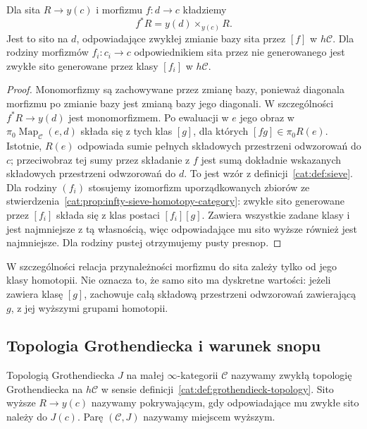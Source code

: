 \begin{stwierdzenie}\label{cat:prop:infty-sieve-pullback}
Dla sita $R\to y(c)$ i morfizmu $f:d\to c$ kładziemy
\[
 f^*R=y(d)\times_{y(c)}R.
\]
Jest to sito na $d$, odpowiadające zwykłej zmianie bazy sita przez $[f]$ w $h\mathcal C$. Dla rodziny morfizmów $f_i:c_i\to c$ odpowiednikiem sita przez nie generowanego jest zwykłe sito generowane przez klasy $[f_i]$ w $h\mathcal C$.
\end{stwierdzenie}
\begin{proof}
Monomorfizmy są zachowywane przez zmianę bazy, ponieważ diagonala morfizmu po zmianie bazy jest zmianą bazy jego diagonali. W szczególności $f^*R\to y(d)$ jest monomorfizmem. Po ewaluacji w $e$ jego obraz w $\pi_0\operatorname{Map}_{\mathcal C}(e,d)$ składa się z tych klas $[g]$, dla których $[fg]\in\pi_0R(e)$. Istotnie, $R(e)$ odpowiada sumie pełnych składowych przestrzeni odwzorowań do $c$; przeciwobraz tej sumy przez składanie z $f$ jest sumą dokładnie wskazanych składowych przestrzeni odwzorowań do $d$. To jest wzór z definicji~\ref{cat:def:sieve}. Dla rodziny $(f_i)$ stosujemy izomorfizm uporządkowanych zbiorów ze stwierdzenia~\ref{cat:prop:infty-sieve-homotopy-category}: zwykłe sito generowane przez $[f_i]$ składa się z klas postaci $[f_i][g]$. Zawiera wszystkie zadane klasy i jest najmniejsze z tą własnością, więc odpowiadające mu sito wyższe również jest najmniejsze. Dla rodziny pustej otrzymujemy pusty presnop.
\end{proof}

W szczególności relacja przynależności morfizmu do sita zależy tylko od jego klasy homotopii. Nie oznacza to, że samo sito ma dyskretne wartości: jeżeli zawiera klasę $[g]$, zachowuje całą składową przestrzeni odwzorowań zawierającą $g$, z jej wyższymi grupami homotopii.

\subsection{Topologia Grothendiecka i warunek snopu}

\begin{definicja}\label{cat:def:infty-grothendieck-topology}
Topologią Grothendiecka $J$ na małej $\infty$-kategorii $\mathcal C$ nazywamy zwykłą topologię Grothendiecka na $h\mathcal C$ w sensie definicji~\ref{cat:def:grothendieck-topology}. Sito wyższe $R\to y(c)$ nazywamy pokrywającym, gdy odpowiadające mu zwykłe sito należy do $J(c)$. Parę $(\mathcal C,J)$ nazywamy miejscem wyższym.
\end{definicja}

